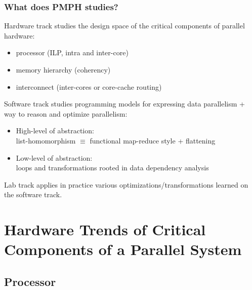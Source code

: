 \documentclass{beamer}
\begin{document}
\begin{frame}[fragile]
\frametitle{What does PMPH studies?}

Hardware track studies the design space of the critical components of parallel hardware:\medskip
    \begin{itemize}
        \item processor (ILP, intra and inter-core)\smallskip
        \item memory hierarchy (coherency)\smallskip
        \item interconnect (inter-cores or core-cache routing)\smallskip
    \end{itemize}
\bigskip
\pause

Software track studies programming models for expressing data parallelism + way to reason and optimize parallelism:\medskip
    \begin{itemize}
        \item High-level of abstraction:\\ 
                list-homomorphism $\equiv$ functional map-reduce style + flattening\smallskip
        \item Low-level of abstraction:\\
                loops and transformations rooted in data dependency analysis
    \end{itemize}
\bigskip
\pause

Lab track applies in practice various optimizations/transformations learned on the software track.

\end{frame}



\section{Hardware Trends of Critical Components of a Parallel System}

\begin{frame}[fragile]
	\tableofcontents[currentsection]
\end{frame}

\subsection{Processor}
\end{document}
